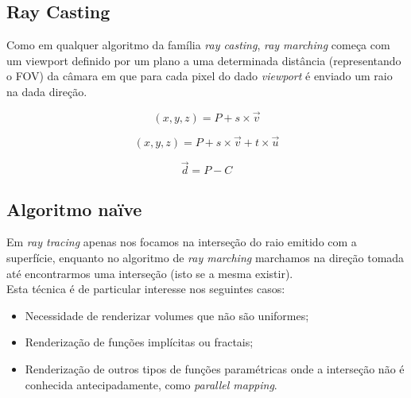 

\subsection{Ray Casting}
Como em qualquer algoritmo da família \textit{ray casting}, \textit{ray marching} começa com um viewport definido por um plano a uma determinada distância (representando o \ac{FOV}) da câmara em que para cada pixel do dado \textit{viewport} é enviado um raio na dada direção.

\begin{equation}
    (x, y, z) = P + s \times \overrightarrow{v}
\end{equation}

\begin{equation}
    (x, y, z) = P + s \times \overrightarrow{v} + t \times \overrightarrow{u}
\end{equation}

\begin{equation}
    \overrightarrow{d} = P - C
\end{equation}




\subsection{Algoritmo naïve}
Em \textit{ray tracing} apenas nos focamos na interseção do raio emitido com a superfície, enquanto no algoritmo de \textit{ray marching} marchamos na direção tomada até encontrarmos uma interseção (isto se a mesma existir).\\

Esta técnica é de particular interesse nos seguintes casos:
\begin{itemize}
    \item Necessidade de renderizar volumes que não são uniformes;
    \item Renderização de funções implícitas ou fractais;
    \item Renderização de outros tipos de funções paramétricas onde a interseção não é conhecida antecipadamente, como \textit{parallel mapping}.
\end{itemize}

